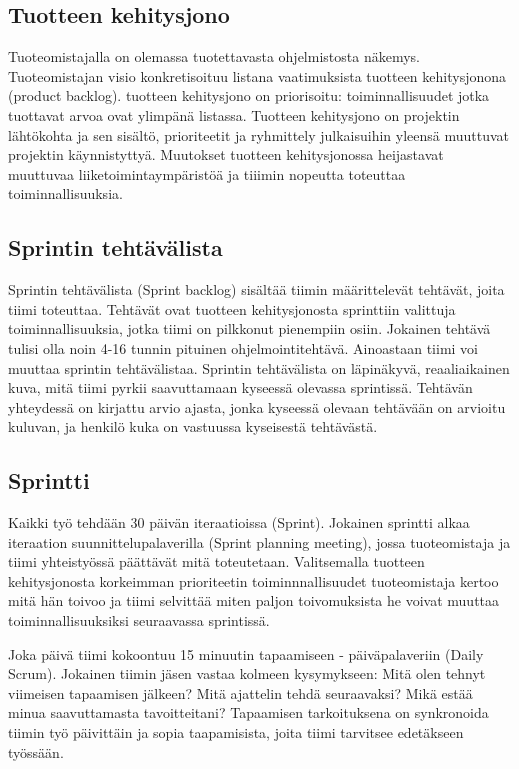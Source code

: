 \documentclass[finnish]{tktltiki2}
\theoremstyle{definition}
\theoremstyle{remark}
\begin{document}
\subsection*{Tuotteen kehitysjono}

Tuoteomistajalla on olemassa tuotettavasta ohjelmistosta näkemys. Tuoteomistajan visio konkretisoituu listana vaatimuksista tuotteen kehitysjonona (product backlog). tuotteen kehitysjono on priorisoitu: toiminnallisuudet jotka tuottavat arvoa ovat ylimpänä listassa. Tuotteen kehitysjono on projektin lähtökohta ja sen sisältö, prioriteetit ja ryhmittely julkaisuihin yleensä muuttuvat projektin käynnistyttyä. Muutokset tuotteen kehitysjonossa heijastavat muuttuvaa liiketoimintaympäristöä ja tiiimin nopeutta toteuttaa toiminnallisuuksia\cite{SCH09}.

\subsection*{Sprintin tehtävälista}

Sprintin tehtävälista (Sprint backlog) sisältää tiimin määrittelevät tehtävät, joita tiimi toteuttaa. Tehtävät ovat tuotteen kehitysjonosta sprinttiin valittuja toiminnallisuuksia, jotka tiimi on pilkkonut pienempiin osiin. Jokainen tehtävä tulisi olla noin 4-16 tunnin pituinen ohjelmointitehtävä. Ainoastaan tiimi voi muuttaa sprintin tehtävälistaa. Sprintin tehtävälista on läpinäkyvä, reaaliaikainen kuva, mitä tiimi pyrkii saavuttamaan kyseessä olevassa sprintissä. Tehtävän yhteydessä on kirjattu arvio ajasta, jonka kyseessä olevaan tehtävään on arvioitu kuluvan, ja henkilö kuka on vastuussa kyseisestä tehtävästä\cite{SCH09}.

\subsection*{Sprintti}

Kaikki työ tehdään 30 päivän iteraatioissa (Sprint). Jokainen sprintti alkaa iteraation suunnittelupalaverilla (Sprint planning meeting), jossa tuoteomistaja ja tiimi yhteistyössä päättävät mitä toteutetaan. Valitsemalla tuotteen kehitysjonosta korkeimman prioriteetin toiminnnallisuudet tuoteomistaja kertoo mitä hän toivoo ja tiimi selvittää miten paljon toivomuksista he voivat muuttaa toiminnallisuuksiksi seuraavassa sprintissä\cite{SCH09}.

Joka päivä tiimi kokoontuu 15 minuutin tapaamiseen - päiväpalaveriin (Daily Scrum). Jokainen tiimin jäsen vastaa kolmeen kysymykseen: Mitä olen tehnyt viimeisen tapaamisen jälkeen? Mitä ajattelin tehdä seuraavaksi? Mikä estää minua saavuttamasta tavoitteitani? Tapaamisen tarkoituksena on synkronoida tiimin työ päivittäin ja sopia taapamisista, joita tiimi tarvitsee edetäkseen työssään\cite{SCH09}.
\end{document}
